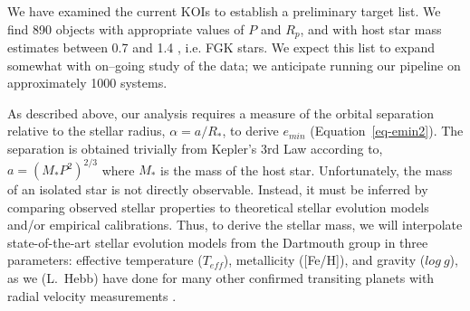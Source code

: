 

\medskip
{\centerline{}}
\smallskip

We have examined the current KOIs to establish a preliminary target
list.  We find 890 objects with appropriate values of $P$ and $R_p$,
and with host star mass estimates between 0.7 and 1.4 \msun, i.e. FGK
stars.  We expect this list to expand somewhat with on--going study of
the \kepler data; we anticipate running our pipeline on approximately
1000 systems.

As described above, our analysis requires a measure of the orbital
separation relative to the stellar radius, $\alpha = a / R_*$, to
derive $e_{min}$ (Equation~\ref{eq-emin2}).  The separation is
obtained trivially from Kepler's 3rd Law according to, $a = (M_*
P^{2})^{2/3}$ where $M_*$ is the mass of the host star.
Unfortunately, the mass of an isolated star is not directly
observable.  Instead, it must be inferred by comparing observed
stellar properties to theoretical stellar evolution models and/or
empirical calibrations.  Thus, to derive the stellar mass, we will
interpolate state-of-the-art stellar evolution models from the
Dartmouth group \citep{Dotter2008} in three parameters: effective
temperature ($T_{eff}$), metallicity ([Fe/H]), and gravity ($log~g$),
as we (L.~Hebb) have done for many other confirmed transiting planets
with radial velocity measurements \citep[e.g.][]{Hebb2009,Hebb2010}.

